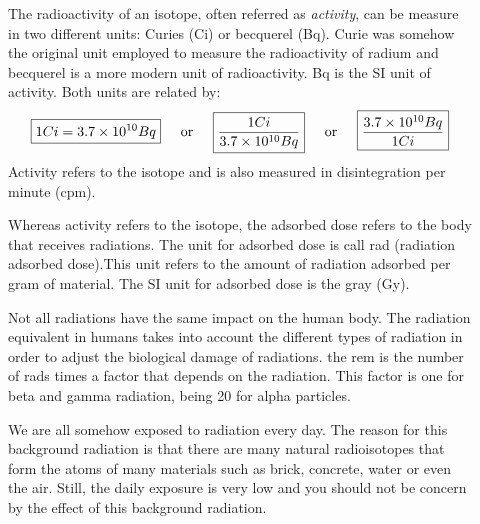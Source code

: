 \documentclass[main.tex]{subfiles}
\begin{document}
\begin{description}
\item[] The radioactivity of an isotope, often referred as \emph{activity}, can be measure in two different units: Curies (Ci) or becquerel (Bq). Curie was somehow the original unit employed to measure the radioactivity of radium and becquerel is a more modern unit of radioactivity. Bq is the SI unit of activity. Both units are related by:
\begin{equation}\boxed{    1 Ci=3.7 \times10^{10} Bq   } \hspace{0.5cm} \text{or} \hspace{0.5cm}   \boxed{\frac{1 Ci}{3.7 \times10^{10} Bq}}\hspace{0.5cm} \text{or} \hspace{0.5cm}   \boxed{\frac{3.7 \times10^{10} Bq}{1 Ci}} \label{formula4:3}\end{equation}
Activity refers to the isotope and is also measured in disintegration per minute (cpm).
\item[] Whereas activity refers to the isotope, the adsorbed dose refers to the body that receives radiations. The unit for adsorbed dose is call rad (radiation adsorbed dose).This unit refers to the amount of radiation adsorbed per gram of material. The SI unit for adsorbed dose is the gray (Gy).

\item[] Not all radiations have the same impact on the human body. The radiation equivalent in humans takes into account the different types of radiation in order to adjust the biological damage of radiations. the rem is the number of rads times a factor that depends on the radiation. This factor is one for beta and gamma radiation, being 20 for alpha particles.




\item[] 
We are all somehow exposed to radiation every day. The reason for this background radiation is that there are many natural radioisotopes that form the atoms of many materials such as brick, concrete, water or even the air. Still, the daily exposure is very low and you should not be concern by the effect of this background radiation. 



\end{description}
\end{document}
